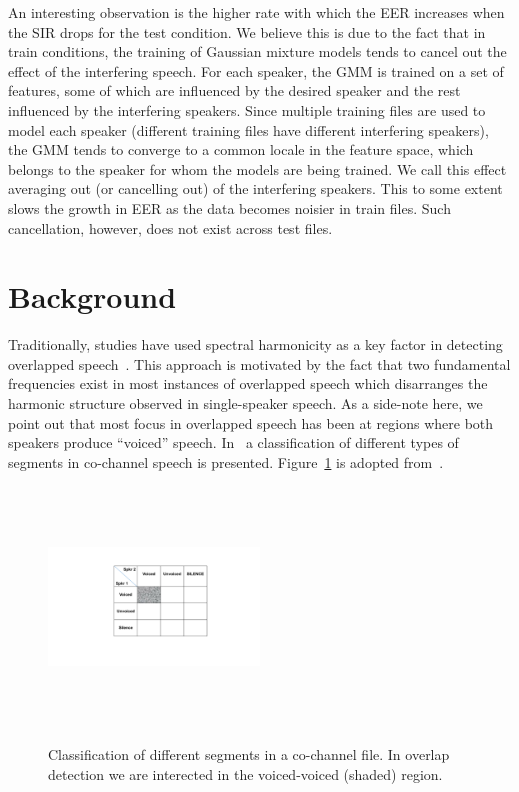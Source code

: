 An interesting observation is the higher rate with which the EER increases when the SIR drops for the test condition.
We believe this is due to the fact that in train conditions, the training of Gaussian mixture models tends to cancel out the effect of the interfering speech.
For each speaker, the GMM is trained on a set of features, some of which are influenced by the desired speaker and the rest influenced by the interfering speakers.
Since multiple training files are used to model each speaker (different training files have different interfering speakers), the GMM tends to converge to a common locale in the feature space, which belongs to the speaker for whom the models are being trained.
We call this effect averaging out (or cancelling out) of the interfering speakers.
This to some extent slows the growth in EER as the data becomes noisier in train files.
Such cancellation, however, does not exist across test files.

\section{Background}
\label{sp:background}

Traditionally, studies have used spectral harmonicity as a key factor in detecting overlapped speech~\cite{nav_icassp13,smolenski_tut}. 
This approach is motivated by the fact that two fundamental frequencies exist in most instances of overlapped speech which disarranges the harmonic structure observed in single-speaker speech. 
As a side-note here, we point out that most focus in overlapped speech has been at regions where both speakers produce ``voiced'' speech. In~\cite{morgan_cochannel} a classification of different types of segments in co-channel speech is presented. Figure~\ref{fig:morgan_v_uv_table} is adopted from~\cite{morgan_cochannel}. 

\begin{figure}[h!]
	\centering
	\includegraphics[height = 2.5in, width=0.5\textwidth]{figures/morgan_v_uv_table}
	\label{fig:morgan_v_uv_table}
	\caption{Classification of different segments in a co-channel file. In overlap detection we are interected in 
		the voiced-voiced (shaded) region.}
\end{figure}


